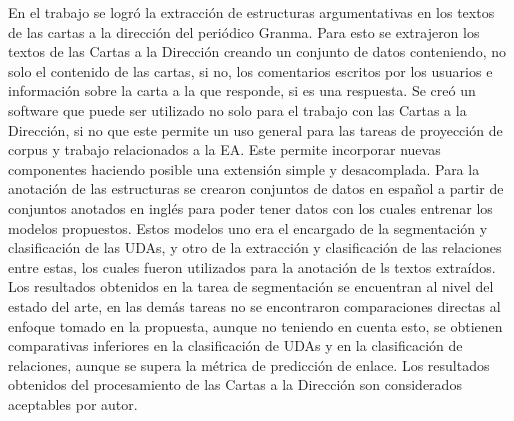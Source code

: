 \begin{conclusions}

    
En el trabajo se logró la extracción de estructuras argumentativas en los textos de las 
cartas a la dirección del periódico Granma. Para esto se 
extrajeron los textos de las Cartas a la Dirección creando un conjunto de datos
conteniendo, no solo el contenido de las cartas, si no, los comentarios 
escritos por los usuarios e información sobre la carta a la que responde, si es una respuesta.
Se creó un software que puede ser utilizado no solo para el trabajo con las Cartas a la Dirección, si no
que este permite un uso general para las tareas de proyección de corpus y trabajo relacionados a la EA.
Este permite incorporar nuevas componentes haciendo posible una extensión simple y desacomplada. 
Para la anotación de las estructuras se crearon conjuntos de datos en español a partir de conjuntos 
anotados en inglés para poder 
tener datos con los cuales entrenar los modelos propuestos. Estos modelos uno era el encargado 
de la segmentación y clasificación de las UDAs, y otro de la extracción y clasificación de las 
relaciones entre estas, los cuales fueron utilizados para la anotación de ls textos extraídos.
Los resultados obtenidos en la tarea de segmentación se encuentran al nivel del estado del arte,
en las demás tareas no se encontraron comparaciones directas al enfoque tomado en la propuesta,
aunque no teniendo en cuenta esto, se obtienen comparativas inferiores en la clasificación
de UDAs y en la clasificación de relaciones, aunque se supera la métrica de predicción de enlace. 
Los resultados obtenidos del procesamiento de las Cartas a la Dirección son considerados 
aceptables por autor. 

\end{conclusions}
